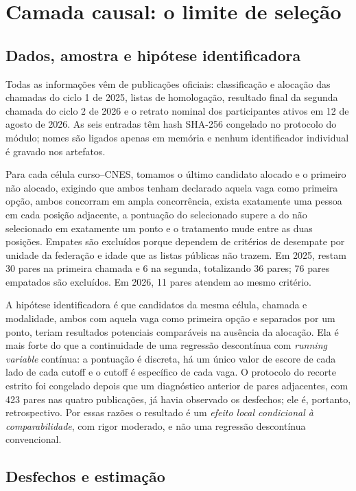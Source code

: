 \documentclass[11pt,a4paper]{article}
\begin{document}
\section{Camada causal: o limite de seleção}
\label{sec:causal}

\subsection{Dados, amostra e hipótese identificadora}

Todas as informações vêm de publicações oficiais: classificação e alocação das
chamadas do ciclo 1 de 2025, listas de homologação, resultado final da segunda
chamada do ciclo 2 de 2026 e o retrato nominal dos participantes ativos em 12
de agosto de 2026. As seis entradas têm hash SHA-256 congelado no protocolo do
módulo; nomes são ligados apenas em memória e nenhum identificador individual é
gravado nos artefatos.

Para cada célula curso--CNES, tomamos o último candidato alocado e o primeiro
não alocado, exigindo que ambos tenham declarado aquela vaga como primeira
opção, ambos concorram em ampla concorrência, exista exatamente uma pessoa em
cada posição adjacente, a pontuação do selecionado supere a do não selecionado
em exatamente um ponto e o tratamento mude entre as duas posições. Empates são
excluídos porque dependem de critérios de desempate por unidade da federação e
idade que as listas públicas não trazem. Em 2025, restam 30 pares na primeira
chamada e 6 na segunda, totalizando 36 pares; 76 pares empatados são excluídos.
Em 2026, 11 pares atendem ao mesmo critério.

A hipótese identificadora é que candidatos da mesma célula, chamada e
modalidade, ambos com aquela vaga como primeira opção e separados por um ponto,
teriam resultados potenciais comparáveis na ausência da alocação. Ela é mais
forte do que a continuidade de uma regressão descontínua com \emph{running
variable} contínua: a pontuação é discreta, há um único valor de escore de cada
lado de cada cutoff e o cutoff é específico de cada vaga. O protocolo do recorte
estrito foi congelado depois que um diagnóstico anterior de pares adjacentes,
com 423 pares nas quatro publicações, já havia observado os desfechos; ele é,
portanto, retrospectivo. Por essas razões o resultado é um \emph{efeito local
condicional à comparabilidade}, com rigor moderado, e não uma regressão
descontínua convencional.

\subsection{Desfechos e estimação}
\end{document}
